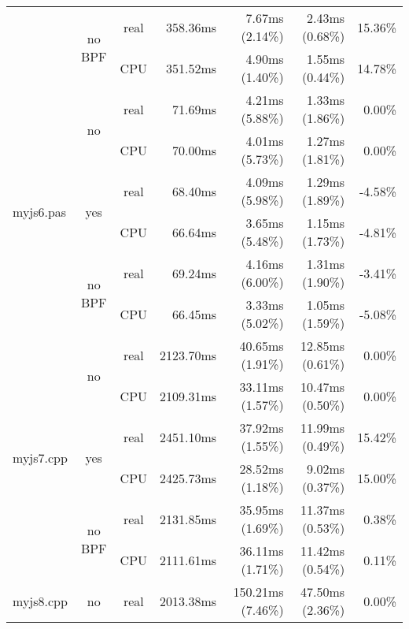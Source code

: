 \documentclass[en]{pracamgr}
\begin{document}
\begin{small}
\begin{longtable}{|l|c|c|r|r|r|r|}
                            \cline{2-7}
                            & \multirow{2}{*}{no BPF} & real & 358.36ms & 7.67ms (2.14\%) & 2.43ms (0.68\%) & 15.36\% \\*
                            &                         & CPU  & 351.52ms & 4.90ms (1.40\%) & 1.55ms (0.44\%) & 14.78\% \\
\hline
\multirow{6}{*}{myjs6.pas}  & \multirow{2}{*}{no}     & real & 71.69ms & 4.21ms (5.88\%) & 1.33ms (1.86\%) & 0.00\% \\*
                            &                         & CPU  & 70.00ms & 4.01ms (5.73\%) & 1.27ms (1.81\%) & 0.00\% \\*
                            \cline{2-7}
                            & \multirow{2}{*}{yes}    & real & 68.40ms & 4.09ms (5.98\%) & 1.29ms (1.89\%) & -4.58\% \\*
                            &                         & CPU  & 66.64ms & 3.65ms (5.48\%) & 1.15ms (1.73\%) & -4.81\% \\*
                            \cline{2-7}
                            & \multirow{2}{*}{no BPF} & real & 69.24ms & 4.16ms (6.00\%) & 1.31ms (1.90\%) & -3.41\% \\*
                            &                         & CPU  & 66.45ms & 3.33ms (5.02\%) & 1.05ms (1.59\%) & -5.08\% \\
\hline
\multirow{6}{*}{myjs7.cpp}  & \multirow{2}{*}{no}     & real & 2123.70ms & 40.65ms (1.91\%) & 12.85ms (0.61\%) & 0.00\% \\*
                            &                         & CPU  & 2109.31ms & 33.11ms (1.57\%) & 10.47ms (0.50\%) & 0.00\% \\*
                            \cline{2-7}
                            & \multirow{2}{*}{yes}    & real & 2451.10ms & 37.92ms (1.55\%) & 11.99ms (0.49\%) & 15.42\% \\*
                            &                         & CPU  & 2425.73ms & 28.52ms (1.18\%) & 9.02ms (0.37\%) & 15.00\% \\*
                            \cline{2-7}
                            & \multirow{2}{*}{no BPF} & real & 2131.85ms & 35.95ms (1.69\%) & 11.37ms (0.53\%) & 0.38\% \\*
                            &                         & CPU  & 2111.61ms & 36.11ms (1.71\%) & 11.42ms (0.54\%) & 0.11\% \\
\hline
\multirow{6}{*}{myjs8.cpp}  & \multirow{2}{*}{no}     & real & 2013.38ms & 150.21ms (7.46\%) & 47.50ms (2.36\%) & 0.00\% \\*

\end{longtable}
\end{small}
\end{document}
